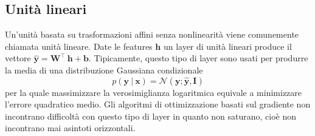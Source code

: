 \documentclass[12pt,a4paper]{report}
\begin{document}
    \subsection{Unit\`a lineari}
    Un'unit\`a basata su trasformazioni affini senza nonlinearit\`a 
    viene comunemente chiamata unit\`a lineare. Date le features 
    $\boldsymbol{h}$ un layer di unit\`a lineari produce il vettore
    $\boldsymbol{\hat{y}}=\boldsymbol{W}^\intercal\ \boldsymbol{h}+\boldsymbol{b}$.
    Tipicamente, questo tipo di layer sono usati per produrre la media
    di una distribuzione Gaussiana condizionale
    \begin{equation}
        p(\boldsymbol{y}\ |\ \boldsymbol{x})=\mathcal{N}(\boldsymbol{y};\boldsymbol{\hat{y}},\boldsymbol{I})
    \end{equation}
    per la quale massimizzare la verosimiglianza logaritmica equivale 
    a minimizzare l'errore quadratico medio. Gli algoritmi di 
    ottimizzazione basati sul gradiente non incontrano difficolt\`a con
    questo tipo di layer in quanto non saturano, cio\`e non incontrano 
    mai asintoti orizzontali.
    
\end{document}
